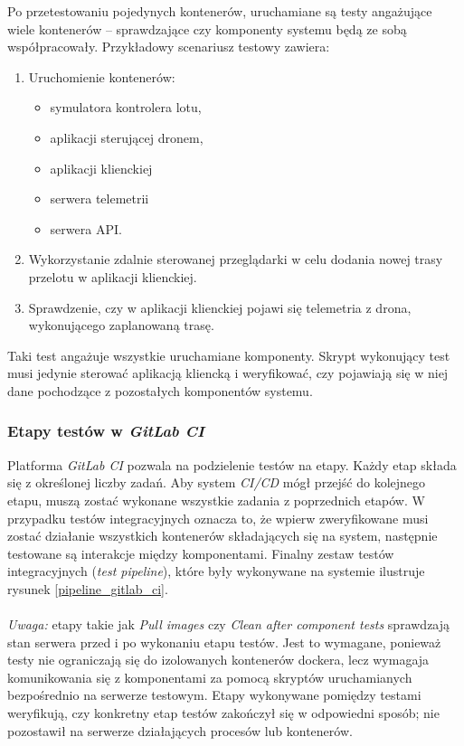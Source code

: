 Po przetestowaniu pojedynych kontenerów, uruchamiane są testy angażujące
wiele kontenerów -- sprawdzające czy komponenty systemu będą ze sobą współpracowały.
Przykładowy scenariusz testowy zawiera:

\begin{enumerate}
    \item Uruchomienie kontenerów:
    \begin{itemize}
        \item symulatora kontrolera lotu,
        \item aplikacji sterującej dronem,
        \item aplikacji klienckiej
        \item serwera telemetrii
        \item serwera API.
    \end{itemize}
    \item Wykorzystanie zdalnie sterowanej przeglądarki w
            celu dodania nowej trasy przelotu w aplikacji klienckiej.
    \item Sprawdzenie, czy w aplikacji klienckiej pojawi się telemetria z drona,
            wykonującego zaplanowaną trasę.
\end{enumerate}

Taki test angażuje wszystkie uruchamiane komponenty. Skrypt wykonujący test
musi jedynie sterować aplikacją kliencką i weryfikować, czy pojawiają się
w niej dane pochodzące z pozostałych komponentów systemu.

\subsubsection{Etapy testów w \textit{GitLab CI}}

Platforma \textit{GitLab CI} pozwala na podzielenie testów na etapy. 
Każdy etap składa się z określonej liczby zadań. Aby system \textit{CI/CD}
mógł przejść do kolejnego etapu, muszą zostać wykonane wszystkie zadania 
z poprzednich etapów. W przypadku testów integracyjnych oznacza to, że wpierw
zweryfikowane musi zostać działanie wszystkich kontenerów składających się
na system, następnie testowane są interakcje między komponentami. 
Finalny zestaw testów integracyjnych (\textit{test pipeline}), które były
wykonywane na systemie ilustruje rysunek \ref{pipeline_gitlab_ci}.\\
\\
\noindent
\textit{Uwaga:} etapy takie jak \textit{Pull images} czy \textit{Clean after component tests}
sprawdzają stan serwera przed i po wykonaniu etapu testów. Jest to wymagane, ponieważ testy
nie ograniczają się do izolowanych kontenerów dockera, lecz wymagaja komunikowania się
z komponentami za pomocą skryptów uruchamianych bezpośrednio na serwerze testowym. 
Etapy wykonywane pomiędzy testami weryfikują, czy konkretny etap testów zakończył 
się w odpowiedni sposób; nie pozostawił na serwerze działających procesów lub kontenerów.

